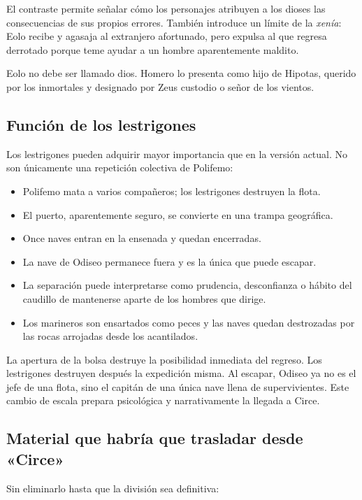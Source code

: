 El contraste permite señalar cómo los personajes atribuyen a los dioses las
consecuencias de sus propios errores. También introduce un límite de la
\emph{xenía}: Eolo recibe y agasaja al extranjero afortunado, pero expulsa al
que regresa derrotado porque teme ayudar a un hombre aparentemente maldito.

Eolo no debe ser llamado dios. Homero lo presenta como hijo de Hipotas,
querido por los inmortales y designado por Zeus custodio o señor de los
vientos.

\subsection*{Función de los lestrigones}

Los lestrigones pueden adquirir mayor importancia que en la versión actual.
No son únicamente una repetición colectiva de Polifemo:

\begin{itemize}
\item Polifemo mata a varios compañeros; los lestrigones destruyen la flota.
\item El puerto, aparentemente seguro, se convierte en una trampa geográfica.
\item Once naves entran en la ensenada y quedan encerradas.
\item La nave de Odiseo permanece fuera y es la única que puede escapar.
\item La separación puede interpretarse como prudencia, desconfianza o hábito
      del caudillo de mantenerse aparte de los hombres que dirige.
\item Los marineros son ensartados como peces y las naves quedan destrozadas
      por las rocas arrojadas desde los acantilados.
\end{itemize}

La apertura de la bolsa destruye la posibilidad inmediata del regreso. Los
lestrigones destruyen después la expedición misma. Al escapar, Odiseo ya no es
el jefe de una flota, sino el capitán de una única nave llena de supervivientes.
Este cambio de escala prepara psicológica y narrativamente la llegada a Circe.

\subsection*{Material que habría que trasladar desde «Circe»}

Sin eliminarlo hasta que la división sea definitiva:

